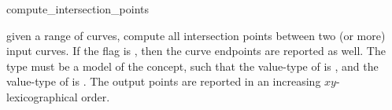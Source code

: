 \ccRefPageBegin

\begin{ccRefFunction}{compute_intersection_points}


{given a range of curves, compute all intersection points between two (or more)
 input curves. If the flag  is , then the
 curve endpoints are reported as well. The  type must be a model
 of the  concept, such that the value-type of
  is , and the value-type of
  is .
 The output points are reported in an increasing $xy$-lexicographical order.}

\end{ccRefFunction}

\ccRefPageEnd

